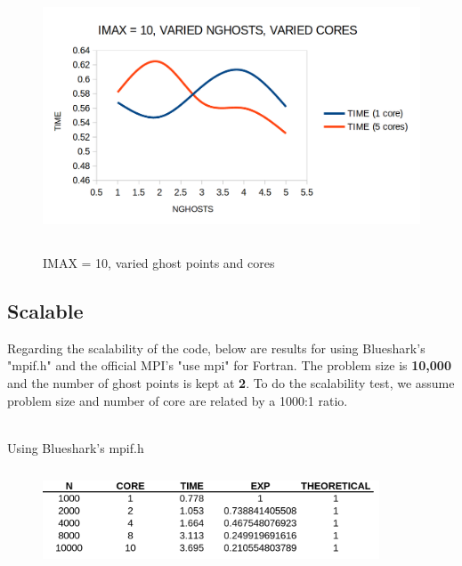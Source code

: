 \documentclass[12pt]{article}
\begin{document}
    \begin{figure}[H]
        \begin{center}
        \hspace*{2.5cm}\includegraphics[height = 80mm,width = 140mm]{smallGhosts.png}
        \caption{IMAX = 10, varied ghost points and cores}                       
        \end{center}  
    \end{figure}    

    \newpage
    \subsection{Scalable}
    Regarding the scalability of the code, below are results for using Blueshark's "mpif.h" and the official MPI's "use mpi" for Fortran.  The problem size is \textbf{10,000} and the number of ghost points is kept at \textbf{2}. To do the scalability test, we assume problem size and number of core are related by a 1000:1 ratio. 

    \noindent
    \\
    Using Blueshark's mpif.h
    \begin{figure}[H]
        \begin{center}
        \includegraphics[height = 30mm,width = 100mm]{scaleBStable.png}             
        \end{center}  
    \end{figure}       
\end{document}

